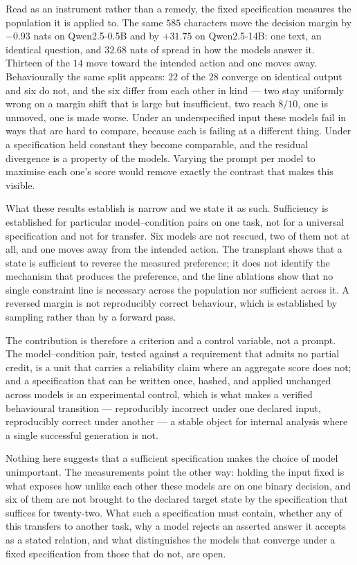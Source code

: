 Read as an instrument rather than a remedy, the fixed specification measures the
population it is applied to. The same $585$ characters move the decision margin by
$-0.93$ nats on Qwen2.5-0.5B and by $+31.75$ on Qwen2.5-14B: one text, an identical
question, and $32.68$ nats of spread in how the models answer it. Thirteen of the
$14$ move toward the intended action and one moves away. Behaviourally the same
split appears: $22$ of the $28$ converge on identical output and six do not, and the
six differ from each other in kind --- two stay uniformly wrong on a margin shift
that is large but insufficient, two reach $8/10$, one is unmoved, one is made worse.
Under an underspecified input these models fail in ways that are hard to compare,
because each is failing at a different thing. Under a specification held constant
they become comparable, and the residual divergence is a property of the models.
Varying the prompt per model to maximise each one's score would remove exactly the
contrast that makes this visible.

What these results establish is narrow and we state it as such. Sufficiency is
established for particular model--condition pairs on one task, not for a universal
specification and not for transfer. Six models are not rescued, two of them not at
all, and one moves away from the intended action. The transplant shows that a state
is sufficient to reverse the measured preference; it does not identify the mechanism
that produces the preference, and the line ablations show that no single constraint
line is necessary across the population nor sufficient across it. A reversed margin
is not reproducibly correct behaviour, which is established by sampling rather than
by a forward pass.

The contribution is therefore a criterion and a control variable, not a prompt. The
model--condition pair, tested against a requirement that admits no partial credit, is
a unit that carries a reliability claim where an aggregate score does not; and a
specification that can be written once, hashed, and applied unchanged across models
is an experimental control, which is what makes a verified behavioural transition ---
reproducibly incorrect under one declared input, reproducibly correct under another
--- a stable object for internal analysis where a single successful generation is
not.

Nothing here suggests that a sufficient specification makes the choice of model
unimportant. The measurements point the other way: holding the input fixed is what
exposes how unlike each other these models are on one binary decision, and six of
them are not brought to the declared target state by the specification that suffices
for twenty-two. What such a specification must contain, whether any of this transfers
to another task, why a model rejects an asserted answer it accepts as a stated
relation, and what distinguishes the models that converge under a fixed
specification from those that do not, are open.
